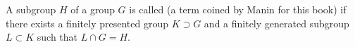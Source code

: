 A subgroup $H$ of a group $G$ is called  (a term coined by Manin for this book) if there exists a finitely presented group $K \supset G$ and a finitely generated subgroup $L \subset K$ such that $L \cap G = H$.
